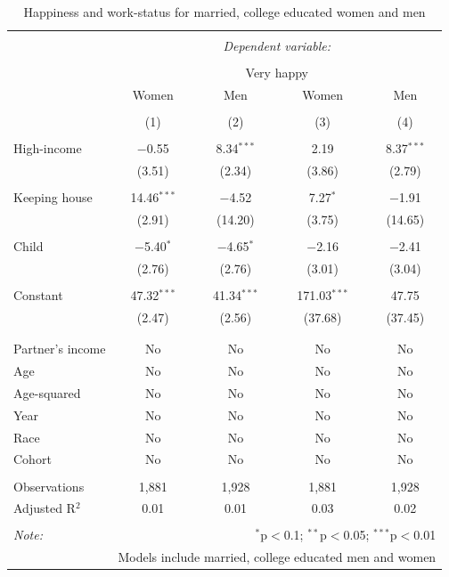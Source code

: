\documentclass[]{article}
\begin{document}
\begin{table}[!htbp] \centering 
  \caption{Happiness and work-status for married, college educated women and men} 
  \label{} 
\begin{tabular}{@{\extracolsep{5pt}}lcccc} 
\\[-1.8ex]\hline 
\hline \\[-1.8ex] 
 & \multicolumn{4}{c}{\textit{Dependent variable:}} \\ 
\cline{2-5} 
\\[-1.8ex] & \multicolumn{4}{c}{Very happy} \\ 
 & Women & Men & Women & Men \\ 
\\[-1.8ex] & (1) & (2) & (3) & (4)\\ 
\hline \\[-1.8ex] 
 High-income & $-$0.55 & 8.34$^{***}$ & 2.19 & 8.37$^{***}$ \\ 
  & (3.51) & (2.34) & (3.86) & (2.79) \\ 
  & & & & \\ 
 Keeping house & 14.46$^{***}$ & $-$4.52 & 7.27$^{*}$ & $-$1.91 \\ 
  & (2.91) & (14.20) & (3.75) & (14.65) \\ 
  & & & & \\ 
 Child & $-$5.40$^{*}$ & $-$4.65$^{*}$ & $-$2.16 & $-$2.41 \\ 
  & (2.76) & (2.76) & (3.01) & (3.04) \\ 
  & & & & \\ 
 Constant & 47.32$^{***}$ & 41.34$^{***}$ & 171.03$^{***}$ & 47.75 \\ 
  & (2.47) & (2.56) & (37.68) & (37.45) \\ 
  & & & & \\ 
\hline \\[-1.8ex] 
Partner's income & No & No & No & No \\ 
Age & No & No & No & No \\ 
Age-squared & No & No & No & No \\ 
Year & No & No & No & No \\ 
Race & No & No & No & No \\ 
Cohort & No & No & No & No \\ 
\hline \\[-1.8ex] 
Observations & 1,881 & 1,928 & 1,881 & 1,928 \\ 
Adjusted R$^{2}$ & 0.01 & 0.01 & 0.03 & 0.02 \\ 
\hline 
\hline \\[-1.8ex] 
\textit{Note:}  & \multicolumn{4}{r}{$^{*}$p$<$0.1; $^{**}$p$<$0.05; $^{***}$p$<$0.01} \\ 
 & \multicolumn{4}{r}{Models include married, college educated men and women} \\ 
\end{tabular} 
\end{table}
\end{document}
